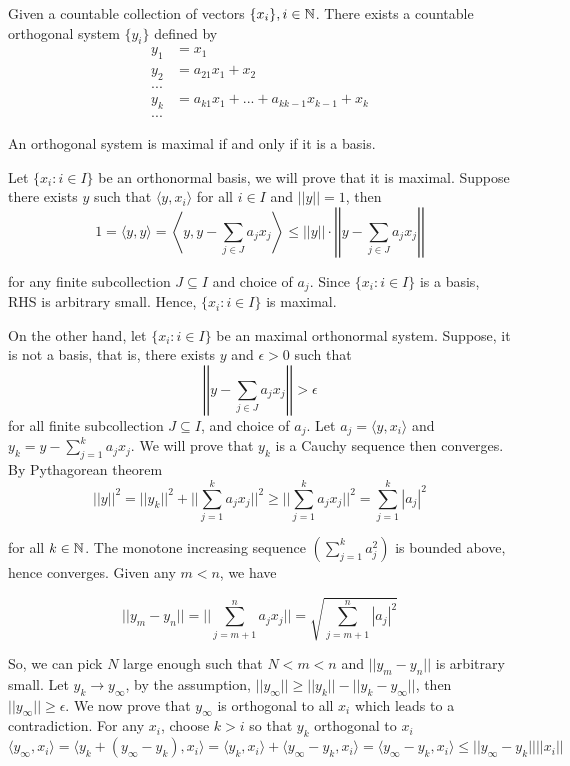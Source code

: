 \documentclass{report}
\begin{document}
\begin{theorem}
    Given a countable collection of vectors $\{ x_i \}, i \in \mathbb{N} $. There exists a countable orthogonal system $\{y_i \}$ defined by
    \begin{align*}
        y_1 &= x_1 \\
        y_2 &= a_{2 1} x_1 + x_2 \\
        ... \\
        y_k &= a_{k 1} x_1 + ... + a_{k k-1} x_{k-1} + x_k \\
        ...
    \end{align*}
\end{theorem}

\begin{theorem}
    An orthogonal system is maximal if and only if it is a basis.
\end{theorem}

Let $\{x_i: i \in I\}$ be an orthonormal basis, we will prove that it is maximal. Suppose there exists $y$ such that $\langle y, x_i \rangle$ for all $i \in I$ and $||y|| = 1$, then
\[
    1 = \langle y, y \rangle = \left\langle y, y - \sum_{j \in J} a_j x_j \right\rangle \leq ||y|| \cdot \left|\left| y - \sum_{j \in J} a_j x_j  \right|\right|
\]

for any finite subcollection $J \subseteq I$ and choice of $a_j$. Since $\{x_i: i \in I\}$ is a basis, RHS is arbitrary small. Hence, $\{x_i: i \in I\}$ is maximal.

On the other hand, let $\{x_i: i \in I\}$ be an maximal orthonormal system. Suppose, it is not a basis, that is, there exists $y$ and $\epsilon > 0$ such that
\[
    \left|\left| y - \sum_{j \in J} a_j x_j  \right|\right| > \epsilon
\]
for all finite subcollection $J \subseteq I$, and choice of $a_j$. Let $a_j = \langle y, x_i\rangle$ and $y_k = y - \sum_{j=1}^k a_j x_j$. We will prove that $y_k$ is a Cauchy sequence then converges. By Pythagorean theorem
\[
    ||y||^2 = ||y_k||^2 + ||\sum_{j=1}^k a_j x_j||^2 \geq ||\sum_{j=1}^k a_j x_j||^2 = \sum_{j=1}^k |a_j|^2
\]

for all $k \in \mathbb{N}$. The monotone increasing sequence $(\sum_{j=1}^k a_j^2)$ is bounded above, hence converges. Given any $m < n$, we have

\[
    ||y_m - y_n|| = ||\sum_{j=m+1}^n a_j x_j|| = \sqrt{\sum_{j=m+1}^n |a_j|^2}
\]

So, we can pick $N$ large enough such that $N < m < n$ and $||y_m - y_n||$ is arbitrary small. Let $y_k \to y_\infty$, by the assumption, $||y_\infty|| \geq ||y_k|| - ||y_k - y_\infty||$, then $||y_\infty|| \geq \epsilon$. We now prove that $y_\infty$ is orthogonal to all $x_i$ which leads to a contradiction. For any $x_i$, choose $k > i$ so that $y_k$ orthogonal to $x_i$
\[
    \langle y_\infty, x_i \rangle = \langle y_k + (y_\infty - y_k), x_i \rangle = \langle y_k , x_i \rangle + \langle y_\infty - y_k , x_i \rangle = \langle y_\infty - y_k , x_i \rangle \leq ||y_\infty - y_k|| ||x_i||
\]
\end{document}
